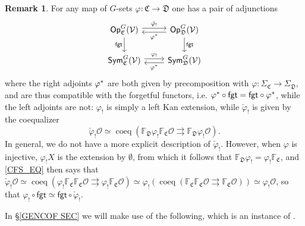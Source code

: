\documentclass[a4paper,10pt
 ,final
]{article}%
\numberwithin{equation}{section}
\numberwithin{figure}{section}
\theoremstyle{definition} %
\newtheorem{remark}[equation]{Remark}%
\newcommand{\Sym}{\ensuremath{\mathsf{Sym}}}%
\newcommand{\Op}{\mathsf{Op}}%
\newcommand{\V}{\ensuremath{\mathcal V}}
\renewcommand{\O}{\ensuremath{\mathcal O}}
\newcommand{\1}{\ensuremath{\mathbbm 1}}%
\begin{document}
\begin{remark}\label{OP_MAP REM}
	For any map of $G$-sets 
	$\varphi \colon \mathfrak C \to \mathfrak D$
	one has a pair of adjunctions
	\begin{equation}\label{GC_CHANGE_EQ}
	\begin{tikzcd}
	\Op^G_{\mathfrak C}(\V) 
	\arrow[shift left]{r}{\check{\varphi}_!}
	\arrow[d, "\mathsf{fgt}"']
	&
	\Op^G_{\mathfrak D}(\V) 
	\arrow[shift left]{l}{\varphi^{\**}}
	\arrow[d, "\mathsf{fgt}"]
	\\
	\Sym^G_{\mathfrak C}(\V) 
	\arrow[shift left]{r}{\varphi_!}
	&
	\Sym^G_{\mathfrak D}(\V) 
	\arrow[shift left]{l}{\varphi^{\**}}
	\end{tikzcd}
	\end{equation}
	where the right adjoints $\varphi^{\**}$ are
	both given by precomposition with
	$\varphi \colon 
	\Sigma_{\mathfrak{C}} \to \Sigma_{\mathfrak{D}}$,
	and are thus compatible with the forgetful functors, 
	i.e. $\varphi^{\**} \circ \mathsf{fgt} = 
	\mathsf{fgt} \circ \varphi^{\**}$, 
	while the left adjoints are not:
	$\varphi_!$ is simply a left Kan extension, while $\check{\varphi}_!$ is given by the coequalizer
	\begin{equation}\label{CFS_EQ}
	\check{\varphi}_! \O \simeq \mathop{\mathrm{coeq}}(\mathbb F_{\mathfrak D} \varphi_! \mathbb F_{\mathfrak C}\O \rightrightarrows \mathbb F_{\mathfrak D} \varphi_! \O).
	\end{equation}
	In general, we do not have a more explicit description of $\check{\varphi}_!$.
	However, when $\varphi$ is injective, 
	$\varphi_!X$ is the extension by $\emptyset$,
	from which it follows that 
	$\mathbb F_{\mathfrak D} \varphi_! = \varphi_! \mathbb F_{\mathfrak C}$,
	and \eqref{CFS_EQ}
	then says that
	$\check{\varphi}_! \O
	\simeq
	\mathop{\mathrm{coeq}} \left( \varphi_! \mathbb{F}_{\mathfrak{C}}  \mathbb{F}_{\mathfrak{C}} \O
	\rightrightarrows 
	\varphi_!  \mathbb{F}_{\mathfrak{C}} \O
	\right)
	\simeq 
	\varphi_! \left( \mathop{\mathrm{coeq}} \left( 
	\mathbb{F}_{\mathfrak{C}}  \mathbb{F}_{\mathfrak{C}} \O
	\rightrightarrows 
	\mathbb{F}_{\mathfrak{C}} \O
	\right) \right)
	\simeq 
	\varphi_! \O$,
	so that  	
	$\varphi_! \circ \mathsf{fgt} \simeq 
	\mathsf{fgt} \circ \check{\varphi}_!$.
\end{remark}


In \S \ref{GENCOF SEC} we will make use of the following,
which is an instance of 
\cite[Rem. \ref{OC-LIMINFIBSUP REM}]{BP_FCOP}.
\end{document}
